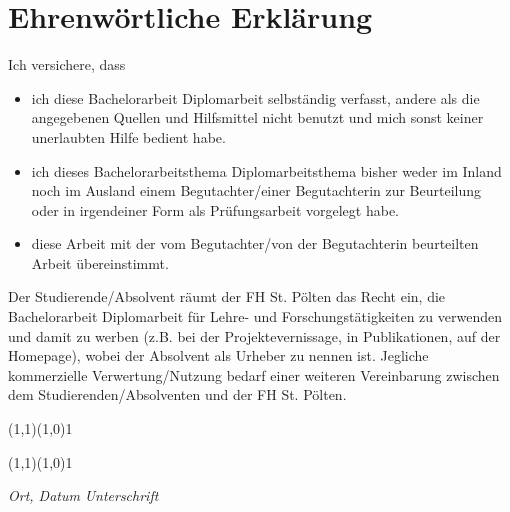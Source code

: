 
{%

\chapter*{Ehrenwörtliche Erklärung}
\label{sec:declaration_de}


Ich versichere, dass


\begin{itemize}
\item ich diese \ifisBakk Bachelorarbeit \else Diplomarbeit \fi selbständig verfasst, andere als die angegebenen Quellen und Hilfsmittel nicht benutzt und mich sonst keiner unerlaubten Hilfe bedient habe.


\item ich dieses \ifisBakk Bachelorarbeitsthema \else Diplomarbeitsthema \fi bisher weder im Inland noch im Ausland einem Begutachter/einer Begutachterin zur Beurteilung oder in irgendeiner Form als Prüfungsarbeit vorgelegt habe.


\item diese Arbeit mit der vom Begutachter/von der Begutachterin beurteilten Arbeit übereinstimmt.

\end{itemize}

Der Studierende/Absolvent räumt der FH St. Pölten das Recht ein, die \ifisBakk Bachelorarbeit \else Diplomarbeit \fi für Lehre- und Forschungstätigkeiten zu verwenden und damit zu werben (z.B. bei der Projektevernissage, in Publikationen, auf der Homepage), wobei der Absolvent als Urheber zu nennen ist. Jegliche kommerzielle Verwertung/Nutzung bedarf einer weiteren Vereinbarung zwischen dem Studierenden/Absolventen und der FH St. Pölten.


\vfill

\setlength{\unitlength}{120pt}

\newcommand{\alinie}{\begin{picture}(1,1)\linethickness{0.08pt}\line(1,0){1}\end{picture}}

\alinie\hfill\alinie

\textit{Ort, Datum} \hfill \textit{Unterschrift}


}
